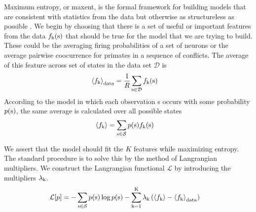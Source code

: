 \documentclass[aps,prl,twocolumn,nofootinbib]{revtex4-1}
\begin{document}
Maximum entropy, or maxent, is the formal framework for building models that are consistent with statistics from the data but otherwise as structureless as possible \cite{Bretthorst:2003ua,Jaynes:1957fy}.
We begin by choosing that there is a set of useful or important features from the data $f_{\rm k}({\rm s})$ that should be true for the model that we are trying to build. These could be the averaging firing probabilities of a set of neurons or the average pairwise coocurrence for primates in a sequence of conflicts. The average of this feature across set of states in the data set $\mathcal{D}$ is 
\begin{align}
	\left<f_{\rm k}\right>_{\rm data} &= \frac{1}{R}\sum_{{\rm s}\in \mathcal{D}} f_{\rm k}({\rm s})
\end{align}
According to the model in which each observation s occurs with some probability $p(\rm s)$, the same average is calculated over all possible states
\begin{align}
	\left<f_{\rm k}\right> &= \sum_{\rm s\in\mathcal{S}} p({\rm s})f_{\rm k}({\rm s})
\end{align}

We assert that the model should fit the $K$ features while maximizing entropy. The standard procedure is to solve this by the method of Langrangian multipliers. We construct the Langrangian functional $\mathcal{L}$ by introducing the multipliers $\lambda_{\rm k}$.
\begin{align}
	\mathcal{L}[p] &= -\sum_{\rm s\in\mathcal{S}} p({\rm s})\log p({\rm s}) - \sum_{\rm k=1}^{\rm K} \lambda_{\rm k} \left(\left<f_{\rm k}\right>-\left<f_{\rm k}\right>_{\rm data}\right)\label{eq:Lagrang}
\end{align}


\end{document}
